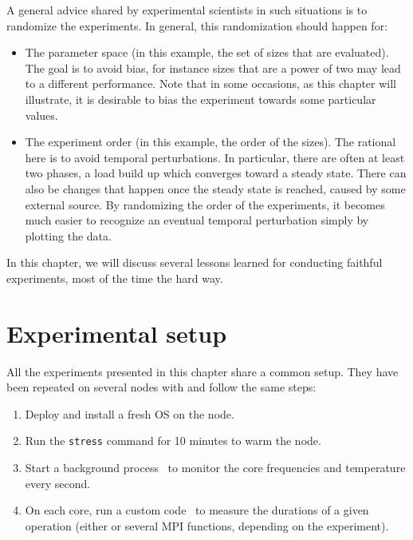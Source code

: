     A general advice shared by experimental scientists in such situations is to randomize the experiments. In general,
    this randomization should happen for:
    \begin{itemize}
        \item The parameter space (in this example, the set of sizes that are evaluated). The goal is to avoid bias, for
            instance sizes that are a power of two may lead to a different performance. Note that in some occasions, as
            this chapter will illustrate, it is desirable to bias the experiment towards some particular values.
        \item The experiment order (in this example, the order of the sizes). The rational here is to avoid temporal
            perturbations. In particular, there are often at least two phases, a load build up which converges toward a
            steady state. There can also be changes that happen once the steady state is reached, \eg caused by some
            external source. By randomizing the order of the experiments, it becomes much easier to recognize an
            eventual temporal perturbation simply by plotting the data.
    \end{itemize}

    In this chapter, we will discuss several lessons learned for conducting faithful experiments, most of the time the
    hard way.

    \section{Experimental setup}%
    \label{sec:experimental_setup}

        All the experiments presented in this chapter share a common setup. They have been repeated on several nodes
        with \peanut and follow the same steps:
        \begin{enumerate}
            \item Deploy and install a fresh OS on the node.
            \item Run the \texttt{stress} command for 10 minutes to warm the node.
            \item Start a background process~\cite{ratatouille} to monitor the core frequencies and temperature every
                second.
            \item On each core, run a custom code~\cite{platform_calibration} to measure the durations of a given
                operation (either \dgemm or several MPI functions, depending on the experiment).
        \end{enumerate}

